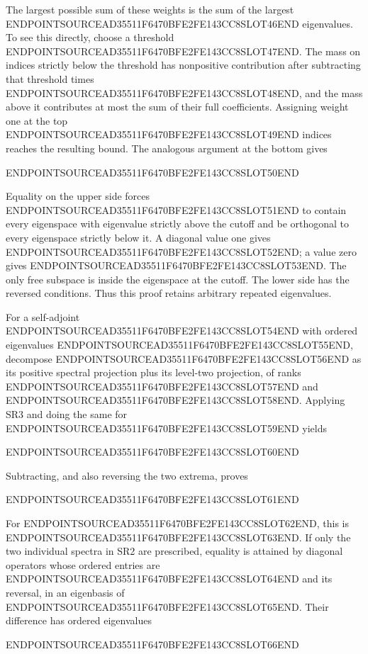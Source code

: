 The largest possible sum of these weights is the sum of the largest ENDPOINTSOURCEAD35511F6470BFE2FE143CC8SLOT46END eigenvalues. To see this directly, choose a threshold ENDPOINTSOURCEAD35511F6470BFE2FE143CC8SLOT47END. The mass on indices strictly below the threshold has nonpositive contribution after subtracting that threshold times ENDPOINTSOURCEAD35511F6470BFE2FE143CC8SLOT48END, and the mass above it contributes at most the sum of their full coefficients. Assigning weight one at the top ENDPOINTSOURCEAD35511F6470BFE2FE143CC8SLOT49END indices reaches the resulting bound. The analogous argument at the bottom gives

ENDPOINTSOURCEAD35511F6470BFE2FE143CC8SLOT50END

Equality on the upper side forces ENDPOINTSOURCEAD35511F6470BFE2FE143CC8SLOT51END to contain every eigenspace with eigenvalue strictly above the cutoff and be orthogonal to every eigenspace strictly below it. A diagonal value one gives ENDPOINTSOURCEAD35511F6470BFE2FE143CC8SLOT52END; a value zero gives ENDPOINTSOURCEAD35511F6470BFE2FE143CC8SLOT53END. The only free subspace is inside the eigenspace at the cutoff. The lower side has the reversed conditions. Thus this proof retains arbitrary repeated eigenvalues.

For a self-adjoint ENDPOINTSOURCEAD35511F6470BFE2FE143CC8SLOT54END with ordered eigenvalues ENDPOINTSOURCEAD35511F6470BFE2FE143CC8SLOT55END, decompose ENDPOINTSOURCEAD35511F6470BFE2FE143CC8SLOT56END as its positive spectral projection plus its level-two projection, of ranks ENDPOINTSOURCEAD35511F6470BFE2FE143CC8SLOT57END and ENDPOINTSOURCEAD35511F6470BFE2FE143CC8SLOT58END. Applying SR3 and doing the same for ENDPOINTSOURCEAD35511F6470BFE2FE143CC8SLOT59END yields

ENDPOINTSOURCEAD35511F6470BFE2FE143CC8SLOT60END

Subtracting, and also reversing the two extrema, proves

ENDPOINTSOURCEAD35511F6470BFE2FE143CC8SLOT61END

For ENDPOINTSOURCEAD35511F6470BFE2FE143CC8SLOT62END, this is ENDPOINTSOURCEAD35511F6470BFE2FE143CC8SLOT63END. If only the two individual spectra in SR2 are prescribed, equality is attained by diagonal operators whose ordered entries are ENDPOINTSOURCEAD35511F6470BFE2FE143CC8SLOT64END and its reversal, in an eigenbasis of ENDPOINTSOURCEAD35511F6470BFE2FE143CC8SLOT65END. Their difference has ordered eigenvalues

ENDPOINTSOURCEAD35511F6470BFE2FE143CC8SLOT66END

